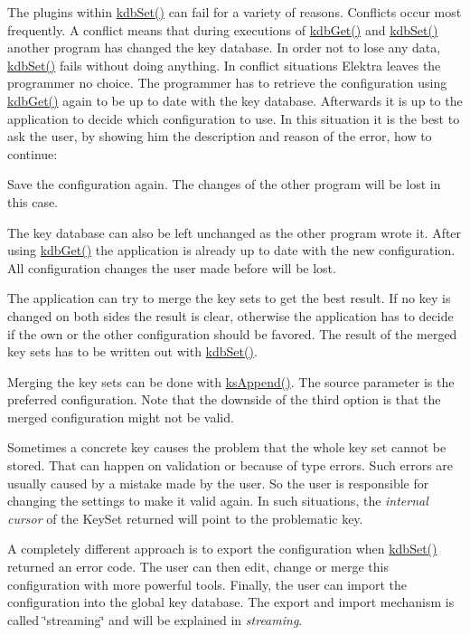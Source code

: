 The plugins within {\ttfamily \hyperlink{group__kdb_ga11436b058408f83d303ca5e996832bcf}{kdb\+Set()}} can fail for a variety of reasons. Conflicts occur most frequently. A conflict means that during executions of {\ttfamily \hyperlink{group__kdb_ga28e385fd9cb7ccfe0b2f1ed2f62453a1}{kdb\+Get()}} and {\ttfamily \hyperlink{group__kdb_ga11436b058408f83d303ca5e996832bcf}{kdb\+Set()}} another program has changed the key database. In order not to lose any data, {\ttfamily \hyperlink{group__kdb_ga11436b058408f83d303ca5e996832bcf}{kdb\+Set()}} fails without doing anything. In conflict situations Elektra leaves the programmer no choice. The programmer has to retrieve the configuration using {\ttfamily \hyperlink{group__kdb_ga28e385fd9cb7ccfe0b2f1ed2f62453a1}{kdb\+Get()}} again to be up to date with the key database. Afterwards it is up to the application to decide which configuration to use. In this situation it is the best to ask the user, by showing him the description and reason of the error, how to continue\+:


\begin{DoxyEnumerate}
\item Save the configuration again. The changes of the other program will be lost in this case.
\item The key database can also be left unchanged as the other program wrote it. After using {\ttfamily \hyperlink{group__kdb_ga28e385fd9cb7ccfe0b2f1ed2f62453a1}{kdb\+Get()}} the application is already up to date with the new configuration. All configuration changes the user made before will be lost.
\item The application can try to merge the key sets to get the best result. If no key is changed on both sides the result is clear, otherwise the application has to decide if the own or the other configuration should be favored. The result of the merged key sets has to be written out with {\ttfamily \hyperlink{group__kdb_ga11436b058408f83d303ca5e996832bcf}{kdb\+Set()}}.
\item Merging the key sets can be done with {\ttfamily \hyperlink{group__keyset_ga21eb9c3a14a604ee3a8bdc779232e7b7}{ks\+Append()}}. The source parameter is the preferred configuration. Note that the downside of the third option is that the merged configuration might not be valid.
\end{DoxyEnumerate}

Sometimes a concrete key causes the problem that the whole key set cannot be stored. That can happen on validation or because of type errors. Such errors are usually caused by a mistake made by the user. So the user is responsible for changing the settings to make it valid again. In such situations, the {\itshape internal cursor} of the {\ttfamily Key\+Set} {\ttfamily returned} will point to the problematic key.

A completely different approach is to export the configuration when {\ttfamily \hyperlink{group__kdb_ga11436b058408f83d303ca5e996832bcf}{kdb\+Set()}} returned an error code. The user can then edit, change or merge this configuration with more powerful tools. Finally, the user can import the configuration into the global key database. The export and import mechanism is called \char`\"{}streaming\char`\"{} and will be explained in {\itshape streaming}. 